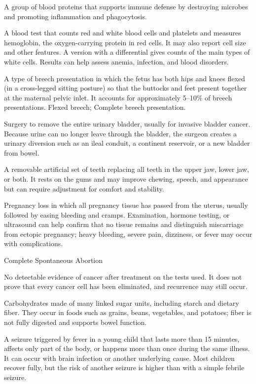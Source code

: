  A group of blood proteins that supports immune defense by destroying microbes and promoting inflammation and phagocytosis.

 A blood test that counts red and white blood cells and platelets and measures hemoglobin, the oxygen-carrying protein in red cells. It may also report cell size and other features. A version with a differential gives counts of the main types of white cells. Results can help assess anemia, infection, and blood disorders.


 A type of breech presentation in which the fetus has both hips and knees flexed (in a cross-legged sitting posture) so that the buttocks and feet present together at the maternal pelvic inlet. It accounts for approximately 5--10\% of breech presentations.
\synonyms Flexed breech; Complete breech presentation.

 Surgery to remove the entire urinary bladder, usually for invasive bladder cancer. Because urine can no longer leave through the bladder, the surgeon creates a urinary diversion such as an ileal conduit, a continent reservoir, or a new bladder from bowel.

 A removable artificial set of teeth replacing all teeth in the upper jaw, lower jaw, or both. It rests on the gums and may improve chewing, speech, and appearance but can require adjustment for comfort and stability.

 Pregnancy loss in which all pregnancy tissue has passed from the uterus, usually followed by easing bleeding and cramps. Examination, hormone testing, or ultrasound can help confirm that no tissue remains and distinguish miscarriage from ectopic pregnancy; heavy bleeding, severe pain, dizziness, or fever may occur with complications.

\synonyms
Complete Spontaneous Abortion

 No detectable evidence of cancer after treatment on the tests used. It does not prove that every cancer cell has been eliminated, and recurrence may still occur.

 Carbohydrates made of many linked sugar units, including starch and dietary fiber. They occur in foods such as grains, beans, vegetables, and potatoes; fiber is not fully digested and supports bowel function.

 A seizure triggered by fever in a young child that lasts more than 15 minutes, affects only part of the body, or happens more than once during the same illness. It can occur with brain infection or another underlying cause. Most children recover fully, but the risk of another seizure is higher than with a simple febrile seizure.

